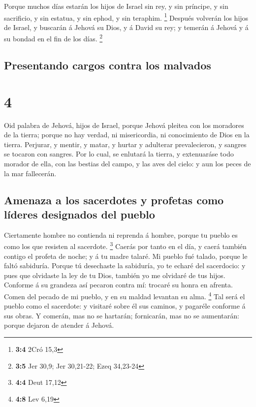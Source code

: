  Porque muchos días estarán los hijos de Israel sin rey, y
sin príncipe, y sin sacrificio, y sin estatua, y sin ephod, y sin
teraphim. \footnote{\textbf{3:4} 2Cró 15,3}  Después
volverán los hijos de Israel, y buscarán á Jehová su Dios, y á David su
rey; y temerán á Jehová y á su bondad en el fin de los días. \footnote{\textbf{3:5}
  Jer 30,9; Jer 30,21-22; Ezeq 34,23-24}

\hypertarget{presentando-cargos-contra-los-malvados}{%
\subsection{Presentando cargos contra los
malvados}\label{presentando-cargos-contra-los-malvados}}

\hypertarget{section-3}{%
\section{4}\label{section-3}}

 Oid palabra de Jehová, hijos de Israel, porque Jehová
pleitea con los moradores de la tierra; porque no hay verdad, ni
misericordia, ni conocimiento de Dios en la tierra. 
Perjurar, y mentir, y matar, y hurtar y adulterar prevalecieron, y
sangres se tocaron con sangres.  Por lo cual, se enlutará la
tierra, y extenuaráse todo morador de ella, con las bestias del campo, y
las aves del cielo: y aun los peces de la mar fallecerán.

\hypertarget{amenaza-a-los-sacerdotes-y-profetas-como-luxedderes-designados-del-pueblo}{%
\subsection{Amenaza a los sacerdotes y profetas como líderes designados
del
pueblo}\label{amenaza-a-los-sacerdotes-y-profetas-como-luxedderes-designados-del-pueblo}}

 Ciertamente hombre no contienda ni reprenda á hombre,
porque tu pueblo es como los que resisten al sacerdote. \footnote{\textbf{4:4}
  Deut 17,12}  Caerás por tanto en el día, y caerá también
contigo el profeta de noche; y á tu madre talaré.  Mi pueblo
fué talado, porque le faltó sabiduría. Porque tú desechaste la
sabiduría, yo te echaré del sacerdocio: y pues que olvidaste la ley de
tu Dios, también yo me olvidaré de tus hijos.  Conforme á su
grandeza así pecaron contra mí: trocaré su honra en afrenta.
 Comen del pecado de mi pueblo, y en su maldad levantan su
alma. \footnote{\textbf{4:8} Lev 6,19}  Tal será el pueblo
como el sacerdote: y visitaré sobre él sus caminos, y pagaréle conforme
á sus obras.  Y comerán, mas no se hartarán; fornicarán,
mas no se aumentarán: porque dejaron de atender á Jehová.

